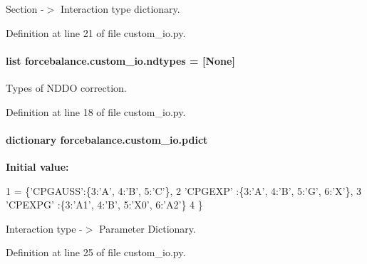 Section -\/$>$ Interaction type dictionary. 



Definition at line 21 of file custom\-\_\-io.\-py.

\hypertarget{namespaceforcebalance_1_1custom__io_a48080cd4a8bed35994bc5233d757c1d4}{
\paragraph[{ndtypes}]{\setlength{\rightskip}{0pt plus 5cm}list forcebalance.\-custom\-\_\-io.\-ndtypes = \mbox{[}None\mbox{]}}}\label{namespaceforcebalance_1_1custom__io_a48080cd4a8bed35994bc5233d757c1d4}


Types of N\-D\-D\-O correction. 



Definition at line 18 of file custom\-\_\-io.\-py.

\hypertarget{namespaceforcebalance_1_1custom__io_a74a4d05e55e54e30aa71b5ee293ca70d}{
\paragraph[{pdict}]{\setlength{\rightskip}{0pt plus 5cm}dictionary forcebalance.\-custom\-\_\-io.\-pdict}}\label{namespaceforcebalance_1_1custom__io_a74a4d05e55e54e30aa71b5ee293ca70d}
{\bfseries Initial value\-:}
\begin{DoxyCode}
1 = \{\textcolor{stringliteral}{'CPGAUSS'}:\{3:\textcolor{stringliteral}{'A'}, 4:\textcolor{stringliteral}{'B'}, 5:\textcolor{stringliteral}{'C'}\},
2          \textcolor{stringliteral}{'CPGEXP'} :\{3:\textcolor{stringliteral}{'A'}, 4:\textcolor{stringliteral}{'B'}, 5:\textcolor{stringliteral}{'G'}, 6:\textcolor{stringliteral}{'X'}\},
3          \textcolor{stringliteral}{'CPEXPG'} :\{3:\textcolor{stringliteral}{'A1'}, 4:\textcolor{stringliteral}{'B'}, 5:\textcolor{stringliteral}{'X0'}, 6:\textcolor{stringliteral}{'A2'}\}
4          \}
\end{DoxyCode}


Interaction type -\/$>$ Parameter Dictionary. 



Definition at line 25 of file custom\-\_\-io.\-py.

